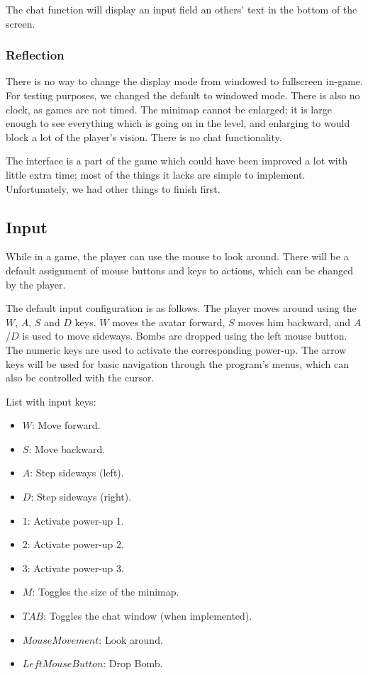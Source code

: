 The chat function will display an input field an others' text in the bottom of the screen.

\subsubsection{Reflection}
There is no way to change the display mode from windowed to fullscreen in-game. For testing purposes, we changed the default to windowed mode. There is also no clock, as games are not timed. The minimap cannot be enlarged; it is large enough to see everything which is going on in the level, and enlarging to would block a lot of the player's vision. There is no chat functionality.

The interface is a part of the game which could have been improved a lot with little extra time; most of the things it lacks are simple to implement. Unfortunately, we had other things to finish first.


\subsection{Input}

While in a game, the player can use the mouse to look around. There will be a default assignment of mouse buttons and keys to actions, which can be changed by the player.

The default input configuration is as follows. The player moves around using the $W$, $A$, $S$ and $D$ keys. $W$ moves the avatar forward, $S$ moves him backward, and $A$/$D$ is used to move sideways. Bombs are dropped using the left mouse button. The numeric keys are used to activate the corresponding power-up. The arrow keys will be used for basic navigation through the program's menus, which can also be controlled with the cursor.

List with input keys:
 \begin{itemize}
    \item $W$: Move forward.
    \item $S$: Move backward.
    \item $A$: Step sideways (left).
    \item $D$: Step sideways (right).
    \item $1$: Activate power-up 1.
    \item $2$: Activate power-up 2.
    \item $3$: Activate power-up 3.
    \item $M$: Toggles the size of the minimap.
    \item $TAB$: Toggles the chat window (when implemented).
    \item $Mouse Movement$: Look around.
    \item $Left Mouse Button$: Drop Bomb.
 \end{itemize}


